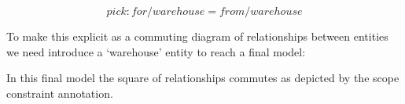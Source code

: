 \documentclass[10pt,a4paper]{scrartcl}
\renewcommand{\erpictureFolder}[0]{../SharedPictures}
\begin{document}
\begin{equation}
pick:for/warehouse=from/warehouse
\end{equation}

To make this explicit as a commuting diagram of relationships between entities
we need introduce a `warehouse' entity  to reach a final model:

\begin{center}

\end{center}
In this final model the square of relationships commutes as depicted by the scope constraint annotation.

 

\end{document}
